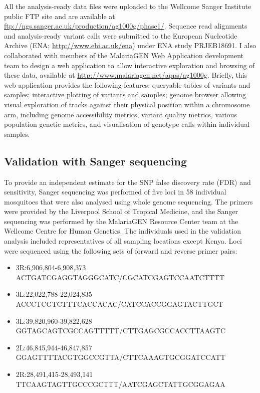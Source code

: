 \begin{refsection}
All the analysis-ready data files were uploaded to the Wellcome Sanger Institute public FTP site and are available at \url{ftp://ngs.sanger.ac.uk/production/ag1000g/phase1/}.
%
Sequence read alignments and analysis-ready variant calls were submitted to the European Nucleotide Archive (ENA; \url{http://www.ebi.ac.uk/ena}) under ENA study PRJEB18691.
%
I also collaborated with members of the MalariaGEN Web Application development team to design a web application to allow interactive exploration and browsing of these data, available at \url{http://www.malariagen.net/apps/ag1000g}.
%
Briefly, this web application provides the following features: queryable tables of variants and samples;
interactive plotting of variants and samples;
genome browser allowing visual exploration of tracks against their physical position within a chromosome arm, including genome accessibility metrics, variant quality metrics, various population genetic metrics, and visualisation of genotype calls within individual samples.


\subsection{Validation with Sanger sequencing}\label{subsec:validation-with-sanger-sequencing}


To provide an independent estimate for the SNP false discovery rate (FDR) and sensitivity, Sanger sequencing was performed of five loci in 58 individual mosquitoes that were also analysed using whole genome sequencing.
%
The primers were provided by the Liverpool School of Tropical Medicine, and the Sanger sequencing was performed by the MalariaGEN Resource Center team at the Wellcome Centre for Human Genetics.
%
The individuals used in the validation analysis included representatives of all sampling locations except Kenya.
%
Loci were sequenced using the following sets of forward and reverse primer pairs: 
%
\begin{itemize}
\item 3R:6,906,804-6,908,373 \\ ACTGATCGAGGTAGGGCATC/CGCATCGAGTCCAATCTTTT
\item 3L:22,022,788-22,024,835 \\ ACCCTCGTCTTTCACCACAC/CATCCACCGGAGTACTTGCT
\item 3L:39,820,960-39,822,628 \\ GGTAGCAGTCGCCAGTTTTT/CTTGAGCGCCACCTTAAGTC
\item 2L:46,845,944-46,847,857 \\ GGAGTTTTACGTGGCCGTTA/CTTCAAAGTGCGGATCCATT 
\item 2R:28,491,415-28,493,141 \\ TTCAAGTAGTTGCCCGCTTT/AATCGAGCTATTGCGGAGAA
\end{itemize}



\end{refsection}
